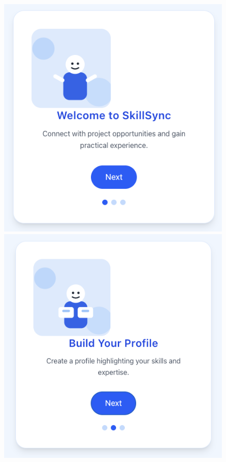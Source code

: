 \begin{figure}[H]
  \centering
  \begin{minipage}[b]{0.45\textwidth}
    \centering
    \includegraphics[width=\linewidth]{figures/Onboarding-1.png}\\[0.3em]
    \includegraphics[width=\linewidth]{figures/Onboarding-2.png}

\end{minipage}
\end{figure}
